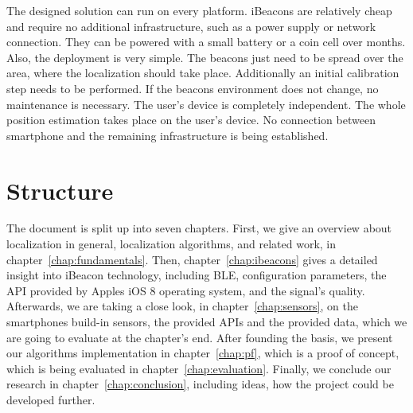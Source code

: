 The designed solution can run on every platform. iBeacons are relatively cheap and require no additional infrastructure, such as a power supply or network connection. They can be powered with a small battery or a coin cell over months. Also, the deployment is very simple. The beacons just need to be spread over the area, where the localization should take place. Additionally an initial calibration step needs to be performed. If the beacons environment does not change, no maintenance is necessary. The user's device is completely independent. The whole position estimation takes place on the user's device. No connection between smartphone and the remaining infrastructure is being established.


%
%
%
%

\section{Structure}
The document is split up into seven chapters. First, we give an overview about localization in general, localization algorithms, and related work, in chapter~\ref{chap:fundamentals}. Then, chapter~\ref{chap:ibeacons} gives a detailed insight into iBeacon technology, including \acs{BLE}, configuration parameters, the \acs{API} provided by Apples iOS 8 operating system, and the signal's quality. Afterwards, we are taking a close look, in chapter~\ref{chap:sensors}, on the smartphones build-in sensors, the provided \acsp{API} and the provided data, which we are going to evaluate at the chapter's end. After founding the basis, we present our algorithms implementation in chapter~\ref{chap:pf}, which is a proof of concept, which is being evaluated in chapter~\ref{chap:evaluation}. Finally, we conclude our research in chapter~\ref{chap:conclusion}, including ideas, how the project could be developed further.


